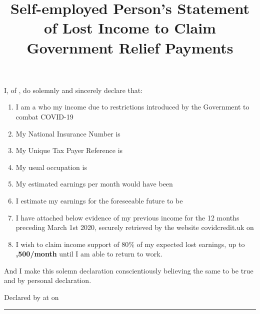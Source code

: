 \documentclass[12pt]{article}
\title{Self-employed Person's Statement of Lost Income to Claim Government Relief Payments}
\begin{document}
\selectfont
{}

\author{\href{\VAR{link_self}}{}}
\date{}
\maketitle

I, \textbf{} of \textbf{}, do solemnly and sincerely declare that: 

\vspace{12pt}

\begin{enumerate}
  \item I am a \textbf{} who \textbf{} my income due to restrictions introduced by the Government to combat COVID-19
  \item My National Insurance Number is \textbf{}
  \item My Unique Tax Payer Reference is \textbf{}
  \item My usual occupation is \textbf{}
  \item My estimated earnings per month would have been \textbf{\textsterling {}}
  \item I estimate my earnings for the foreseeable future to be \textbf{\textsterling {}}
  \item I have attached below evidence of my previous income for the 12 months preceding March 1st 2020, securely retrieved by the website covidcredit.uk on \textbf{}
  \item I wish to claim income support of 80\% of my expected lost earnings, up to \textbf{,500/month} until I am able to return to work.
\end{enumerate}

\vspace{12pt}

And I make this solemn declaration conscientiously believing the same to be true and by personal declaration.

\vspace{36pt}

Declared by \textbf{} at \textbf{} on \textbf{}

\vspace{18pt}

\rule{\textwidth}{0.4pt}
\end{document}
